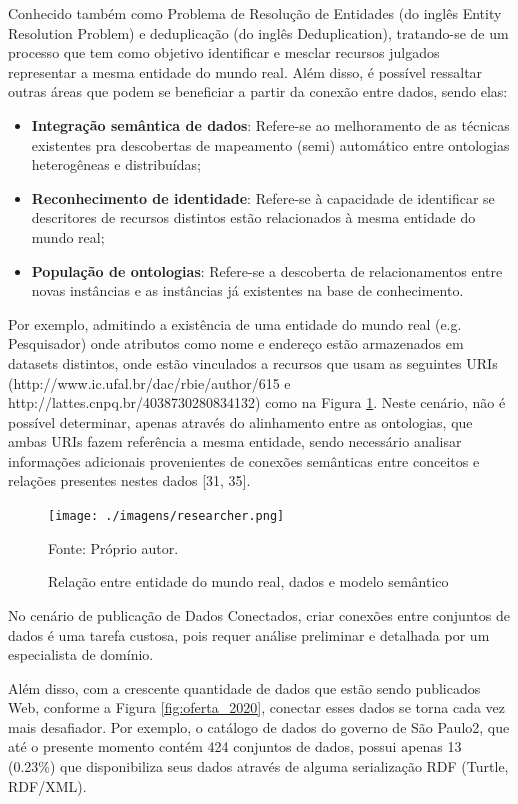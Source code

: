 Conhecido também como Problema de Resolução de Entidades \cite{menestrina2005generic} (do inglês Entity Resolution Problem) e deduplicação \cite{sarawagi2002interactive} (do inglês Deduplication), tratando-se de um processo que tem como objetivo identificar e mesclar recursos julgados representar a mesma entidade do mundo real. Além disso, é possível ressaltar outras áreas que podem se beneficiar a partir da conexão entre dados, sendo elas: 
\begin{itemize}
    \item \textbf{Integração semântica de dados}: Refere-se ao melhoramento de as técnicas existentes pra descobertas de mapeamento (semi) automático entre ontologias heterogêneas e distribuídas; 

    \item \textbf{Reconhecimento de identidade}: Refere-se à capacidade de identificar se descritores de recursos distintos estão relacionados à mesma entidade do mundo real; 

    \item \textbf{População de ontologias}: Refere-se a descoberta de relacionamentos entre novas instâncias e as instâncias já existentes na base de conhecimento. 
\end{itemize}

Por exemplo, admitindo a existência de uma entidade do mundo real (e.g. Pesquisador) onde atributos como nome e endereço estão armazenados em datasets distintos, onde estão vinculados a recursos que usam as seguintes URIs (http://www.ic.ufal.br/dac/rbie/author/615 e http://lattes.cnpq.br/4038730280834132) como na Figura \ref{fig:modelo_semantico}. Neste cenário, não é possível determinar, apenas através do alinhamento entre as ontologias, que ambas URIs fazem referência a mesma entidade, sendo necessário analisar informações adicionais provenientes de conexões semânticas entre conceitos e relações presentes nestes dados [31, 35]. 

\begin{figure}[!ht]
	\centering
	\texttt{[image: ./imagens/researcher.png]}\\
    \caption{Relação entre entidade do mundo real, dados e modelo semântico}
	\footnotesize{Fonte: Próprio autor.}
	\label{fig:modelo_semantico}
\end{figure}
No cenário de publicação de Dados Conectados, criar conexões entre conjuntos de dados é uma tarefa custosa, pois requer análise preliminar e detalhada por um especialista de domínio. 

Além disso, com a crescente quantidade de dados que estão sendo publicados Web, conforme a Figura \ref{fig:oferta_2020}, conectar esses dados se torna cada vez mais desafiador. Por exemplo, o catálogo de dados do governo de São Paulo2, que até o presente momento contém 424 conjuntos de dados, possui apenas 13 (0.23\%) que disponibiliza seus dados através de alguma serialização RDF (Turtle, RDF/XML).  


